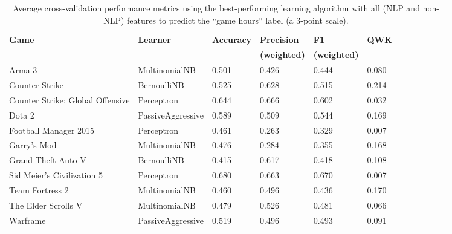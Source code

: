 \documentclass[9pt]{article}
\begin{document}
\begin{table*}[htbp]
\label{tab:gamehours_all_features}
\centering
\begin{tabular}{*{12}{l}}
\hline \bf Game & \bf Learner & \bf Accuracy & \bf Precision & \bf F1 & \bf QWK \\
& & & \bf (weighted) & \bf (weighted) & \\ \hline
Arma 3 & MultinomialNB & 0.501 & 0.426 & 0.444 & 0.080 \\
Counter Strike & BernoulliNB & 0.525 & 0.628 & 0.515 & 0.214 \\
Counter Strike: Global Offensive & Perceptron & 0.644 & 0.666 & 0.602 & 0.032 \\
Dota 2 & PassiveAggressive & 0.589 & 0.509 & 0.544 & 0.169 \\
Football Manager 2015 & Perceptron & 0.461 & 0.263 & 0.329 & 0.007 \\
Garry's Mod & MultinomialNB & 0.476 & 0.284 & 0.355 & 0.168 \\
Grand Theft Auto V & BernoulliNB & 0.415 & 0.617 & 0.418 & 0.108 \\
Sid Meier's Civilization 5 & Perceptron & 0.680 & 0.663 & 0.670 & 0.007 \\
Team Fortress 2 & MultinomialNB & 0.460 & 0.496 & 0.436 & 0.170 \\
The Elder Scrolls V & MultinomialNB & 0.479 & 0.526 & 0.481 & 0.066 \\
Warframe & PassiveAggressive & 0.519 & 0.496 & 0.493 & 0.091 \\ \hline
\end{tabular}
\caption{Average cross-validation performance metrics using the best-performing learning algorithm with all (NLP and non-NLP) features to predict the ``game hours'' label (a 3-point scale).}
\end{table*}
\end{document}
